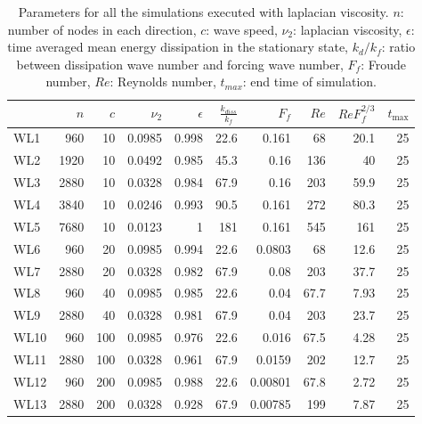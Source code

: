 \begin{table}
\begin{center}

\label{Table2}

\begin{tabular}{lrrrrrrrrr}
\toprule
{} &  $n$ &  $c$ &  $\nu_2$ &  $\epsilon$ &  $\frac{k_{diss}}{k_f}$ &   $F_f$ &  $Re$ &  $ReF_f^{2/3}$ &  $t_{\max}$ \\
\midrule
WL1  &  960 &   10 &   0.0985 &       0.998 &                    22.6 &   0.161 &    68 &           20.1 &          25 \\
WL2  & 1920 &   10 &   0.0492 &       0.985 &                    45.3 &    0.16 &   136 &             40 &          25 \\
WL3  & 2880 &   10 &   0.0328 &       0.984 &                    67.9 &    0.16 &   203 &           59.9 &          25 \\
WL4  & 3840 &   10 &   0.0246 &       0.993 &                    90.5 &   0.161 &   272 &           80.3 &          25 \\
WL5  & 7680 &   10 &   0.0123 &           1 &                     181 &   0.161 &   545 &            161 &          25 \\
WL6  &  960 &   20 &   0.0985 &       0.994 &                    22.6 &  0.0803 &    68 &           12.6 &          25 \\
WL7  & 2880 &   20 &   0.0328 &       0.982 &                    67.9 &    0.08 &   203 &           37.7 &          25 \\
WL8  &  960 &   40 &   0.0985 &       0.985 &                    22.6 &    0.04 &  67.7 &           7.93 &          25 \\
WL9  & 2880 &   40 &   0.0328 &       0.981 &                    67.9 &    0.04 &   203 &           23.7 &          25 \\
WL10 &  960 &  100 &   0.0985 &       0.976 &                    22.6 &   0.016 &  67.5 &           4.28 &          25 \\
WL11 & 2880 &  100 &   0.0328 &       0.961 &                    67.9 &  0.0159 &   202 &           12.7 &          25 \\
WL12 &  960 &  200 &   0.0985 &       0.988 &                    22.6 & 0.00801 &  67.8 &           2.72 &          25 \\
WL13 & 2880 &  200 &   0.0328 &       0.928 &                    67.9 & 0.00785 &   199 &           7.87 &          25 \\
\bottomrule
\end{tabular}

\caption{Parameters for all the simulations executed with laplacian viscosity.
$ n $: number of nodes in each direction, $ c $: wave speed, $ \nu_2 $: laplacian viscosity, $ \epsilon $: time
averaged mean energy dissipation in the stationary state, $ k_{d}/ k_f $: ratio
between dissipation wave number and forcing wave number, $F_f $: Froude
number, $Re$: Reynolds number, $ t_{max} $: end time of simulation.}
\end{center}
\end{table}

